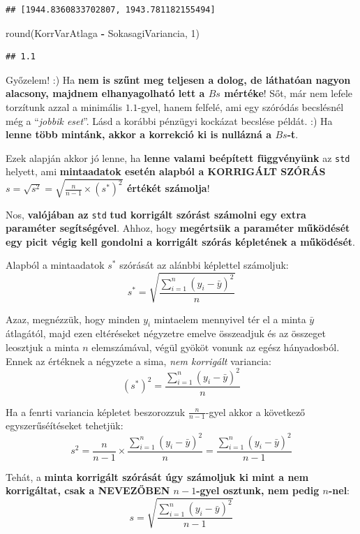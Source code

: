 \documentclass[
]{book}
\newenvironment{Shaded}{\begin{snugshade}}{\end{snugshade}}
\newcommand{\BuiltInTok}[1]{#1}
\newcommand{\DecValTok}[1]{\textcolor[rgb]{0.00,0.00,0.81}{#1}}
\newcommand{\NormalTok}[1]{#1}
\newcommand{\OperatorTok}[1]{\textcolor[rgb]{0.81,0.36,0.00}{\textbf{#1}}}
\begin{document}
\begin{verbatim}
## [1944.8360833702807, 1943.781182155494]
\end{verbatim}

\begin{Shaded}
\begin{Highlighting}[]
\BuiltInTok{round}\NormalTok{(KorrVarAtlaga }\OperatorTok{{-}}\NormalTok{ SokasagiVariancia, }\DecValTok{1}\NormalTok{)}
\end{Highlighting}
\end{Shaded}

\begin{verbatim}
## 1.1
\end{verbatim}

Győzelem! :) Ha \textbf{nem is szűnt meg teljesen a dolog, de láthatóan nagyon alacsony, majdnem elhanyagolható lett a \(Bs\) mértéke}! Sőt, már nem lefele torzítunk azzal a minimális \(1.1\)-gyel, hanem felfelé, ami egy szóródás becslésnél még a ``\emph{jobbik eset}''. Lásd a korábbi pénzügyi kockázat becslése példát. :) Ha \textbf{lenne több mintánk, akkor a korrekció ki is nullázná a \(Bs\)-t}.

Ezek alapján akkor jó lenne, ha \textbf{lenne valami beépített függvényünk} az \texttt{std} helyett, ami \textbf{mintaadatok esetén alapból a KORRIGÁLT SZÓRÁS \(s = \sqrt{s^2}=\sqrt{\frac{n}{n-1} \times (s^*)^2}\) értékét számolja}!

Nos, \textbf{valójában az} \texttt{std} \textbf{tud korrigált szórást számolni egy extra paraméter segítségével}. Ahhoz, hogy \textbf{megértsük a paraméter működését egy picit végig kell gondolni a korrigált szórás képletének a működését}.

Alapból a mintaadatok \(s^*\) szórását az alánbbi képlettel számoljuk: \[s^*=\sqrt{\frac{\sum_{i=1}^n{(y_i-\bar{y})^2}}{n}}\]

Azaz, megnézzük, hogy minden \(y_i\) mintaelem mennyivel tér el a minta \(\bar{y}\) átlagától, majd ezen eltéréseket négyzetre emelve összeadjuk és az összeget leosztjuk a minta \(n\) elemszámával, végül gyököt vonunk az egész hányadosból.
Ennek az értéknek a négyzete a sima, \emph{nem korrigált} variancia: \[(s^*)^2=\frac{\sum_{i=1}^n{(y_i-\bar{y})^2}}{n}\]

Ha a fenrti variancia képletet beszorozzuk \(\frac{n}{n-1}\)-gyel akkor a következő egyszerűséítéseket tehetjük: \[s^2=\frac{n}{n-1} \times \frac{\sum_{i=1}^n{(y_i-\bar{y})^2}}{n} = \frac{\sum_{i=1}^n{(y_i-\bar{y})^2}}{n-1}\]

Tehát, a \textbf{minta korrigált szórását úgy számoljuk ki mint a nem korrigáltat, csak a NEVEZŐBEN \(n-1\)-gyel osztunk, nem pedig \(n\)-nel}: \[s=\sqrt{\frac{\sum_{i=1}^n{(y_i-\bar{y})^2}}{n-1}}\]
\end{document}
